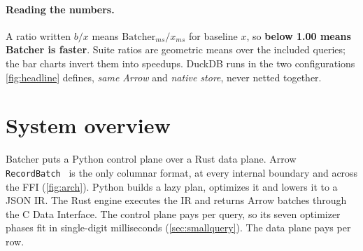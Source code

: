 \documentclass[10pt,twocolumn,letterpaper]{article}   %
\newcommand{\sys}{Batcher}
\newcommand{\bx}{\ensuremath{b/x}}
\begin{document}
\paragraph{Reading the numbers.}
\label{sec:convention}
A ratio written \bx{} means $\text{\sys{}}_{ms}/x_{ms}$ for baseline $x$, so \textbf{below 1.00
means \sys{} is faster}. Suite ratios are geometric means over the included queries; the bar
charts invert them into speedups. DuckDB runs in the two configurations \cref{fig:headline}
defines, \emph{same Arrow} and \emph{native store}, never netted together.
\section{System overview}
\label{sec:arch-overview}

\sys{} puts a Python control plane over a Rust data plane. Arrow
\texttt{RecordBatch}~\cite{arrow} is the only columnar format, at every internal boundary and
across the FFI (\cref{fig:arch}). Python builds a lazy plan, optimizes it and lowers it to a
JSON IR. The Rust engine executes the IR and returns Arrow batches through the C Data
Interface. The control plane pays per query, so its seven optimizer phases fit in
single-digit milliseconds (\cref{sec:smallquery}). The data plane pays per row.
\end{document}
